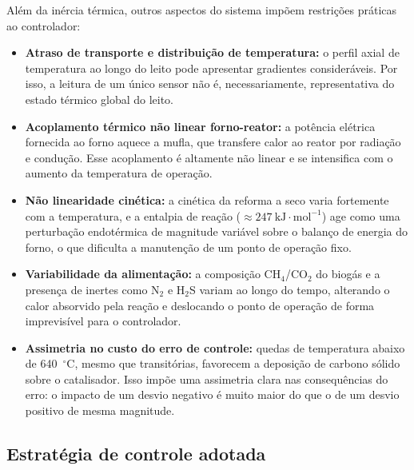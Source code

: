 Além da inércia térmica, outros aspectos do sistema impõem restrições
práticas ao controlador:
\begin{itemize}
  \item \textbf{Atraso de transporte e distribuição de temperatura:} o perfil
    axial de temperatura ao longo do leito pode apresentar gradientes
    consideráveis. Por isso, a leitura de um único sensor não é, necessariamente,
    representativa do estado térmico global do leito.\citep{luyben2014}
  \item \textbf{Acoplamento térmico não linear forno-reator:} a potência elétrica
    fornecida ao forno aquece a mufla, que transfere calor ao reator por
    radiação e condução. Esse acoplamento é altamente não linear e se
    intensifica com o aumento da temperatura de operação.\citep{luyben2014}
  \item \textbf{Não linearidade cinética:} a cinética da reforma a seco varia
    fortemente com a temperatura, e a entalpia de reação
    (\(\approx 247~\text{kJ}\cdot\text{mol}^{-1}\)) age como uma perturbação
    endotérmica de magnitude variável sobre o balanço de energia do forno,
    o que dificulta a manutenção de um ponto de operação fixo.\citep{thermodynamics2025}
  \item \textbf{Variabilidade da alimentação:} a composição CH\(_4\)/CO\(_2\)
    do biogás e a presença de inertes como N\(_2\) e H\(_2\)S variam ao longo
    do tempo, alterando o calor absorvido pela reação e deslocando o ponto
    de operação de forma imprevisível para o controlador.\citep{lavoie2014,thermodynamics2025}
  \item \textbf{Assimetria no custo do erro de controle:} quedas de temperatura
    abaixo de 640~\(^\circ\)C, mesmo que transitórias, favorecem a deposição
    de carbono sólido sobre o catalisador. Isso impõe uma assimetria clara
    nas consequências do erro: o impacto de um desvio negativo é muito maior
    do que o de um desvio positivo de mesma magnitude.\citep{thermodynamics2025,lavoie2014}
\end{itemize}

\subsection{Estratégia de controle adotada}
\label{sec:estrategia}

